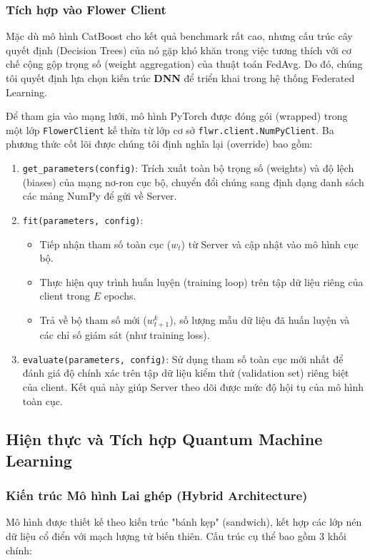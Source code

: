 \subsubsection{Tích hợp vào Flower Client}

Mặc dù mô hình CatBoost cho kết quả benchmark rất cao, nhưng cấu trúc cây quyết định (Decision Trees) của nó gặp khó khăn trong việc tương thích với cơ chế cộng gộp trọng số (weight aggregation) của thuật toán FedAvg. Do đó, chúng tôi quyết định lựa chọn kiến trúc \textbf{DNN} để triển khai trong hệ thống Federated Learning.

Để tham gia vào mạng lưới, mô hình PyTorch được đóng gói (wrapped) trong một lớp \texttt{FlowerClient} kế thừa từ lớp cơ sở \texttt{flwr.client.NumPyClient}. Ba phương thức cốt lõi được chúng tôi định nghĩa lại (override) bao gồm:

\begin{enumerate}
    \item \texttt{get\_parameters(config)}: Trích xuất toàn bộ trọng số (weights) và độ lệch (biases) của mạng nơ-ron cục bộ, chuyển đổi chúng sang định dạng danh sách các mảng NumPy để gửi về Server.
    \item \texttt{fit(parameters, config)}:
    \begin{itemize}
        \item Tiếp nhận tham số toàn cục ($w_t$) từ Server và cập nhật vào mô hình cục bộ.
        \item Thực hiện quy trình huấn luyện (training loop) trên tập dữ liệu riêng của client trong $E$ epochs.
        \item Trả về bộ tham số mới ($w_{t+1}^k$), số lượng mẫu dữ liệu đã huấn luyện và các chỉ số giám sát (như training loss).
    \end{itemize}
    \item \texttt{evaluate(parameters, config)}: Sử dụng tham số toàn cục mới nhất để đánh giá độ chính xác trên tập dữ liệu kiểm thử (validation set) riêng biệt của client. Kết quả này giúp Server theo dõi được mức độ hội tụ của mô hình toàn cục.
\end{enumerate}

\subsection{Hiện thực và Tích hợp Quantum Machine Learning}

\subsubsection{Kiến trúc Mô hình Lai ghép (Hybrid Architecture)}
Mô hình được thiết kế theo kiến trúc "bánh kẹp" (sandwich), kết hợp các lớp nén dữ liệu cổ điển với mạch lượng tử biến thiên. Cấu trúc cụ thể bao gồm 3 khối chính:

